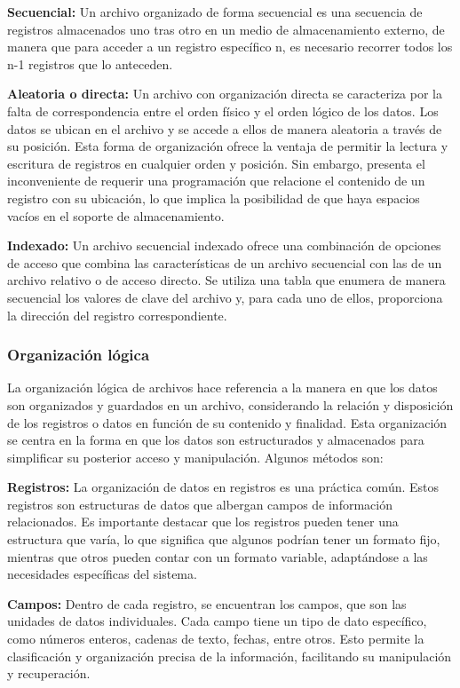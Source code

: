 \documentclass[11pt, twocolumn]{article}
\begin{document}
  \textbf{Secuencial:} Un archivo organizado de forma secuencial es una secuencia de registros almacenados uno tras otro en un medio de almacenamiento externo, de manera que para acceder a un registro específico n, es necesario recorrer todos los n-1 registros que lo anteceden.

  \textbf{Aleatoria o directa:} Un archivo con organización directa se caracteriza por la falta de correspondencia entre el orden físico y el orden lógico de los datos. Los datos se ubican en el archivo y se accede a ellos de manera aleatoria a través de su posición. Esta forma de organización ofrece la ventaja de permitir la lectura y escritura de registros en cualquier orden y posición. Sin embargo, presenta el inconveniente de requerir una programación que relacione el contenido de un registro con su ubicación, lo que implica la posibilidad de que haya espacios vacíos en el soporte de almacenamiento.

  \textbf{Indexado:} Un archivo secuencial indexado ofrece una combinación de opciones de acceso que combina las características de un archivo secuencial con las de un archivo relativo o de acceso directo. Se utiliza una tabla que enumera de manera secuencial los valores de clave del archivo y, para cada uno de ellos, proporciona la dirección del registro correspondiente.

  \subsubsection*{Organización lógica}
  La organización lógica de archivos hace referencia a la manera en que los datos son organizados y guardados en un archivo, considerando la relación y disposición de los registros o datos en función de su contenido y finalidad. Esta organización se centra en la forma en que los datos son estructurados y almacenados para simplificar su posterior acceso y manipulación. Algunos métodos son:

  \textbf{Registros:} La organización de datos en registros es una práctica común. Estos registros son estructuras de datos que albergan campos de información relacionados. Es importante destacar que los registros pueden tener una estructura que varía, lo que significa que algunos podrían tener un formato fijo, mientras que otros pueden contar con un formato variable, adaptándose a las necesidades específicas del sistema.

  \textbf{Campos:} Dentro de cada registro, se encuentran los campos, que son las unidades de datos individuales. Cada campo tiene un tipo de dato específico, como números enteros, cadenas de texto, fechas, entre otros. Esto permite la clasificación y organización precisa de la información, facilitando su manipulación y recuperación.
\end{document}
